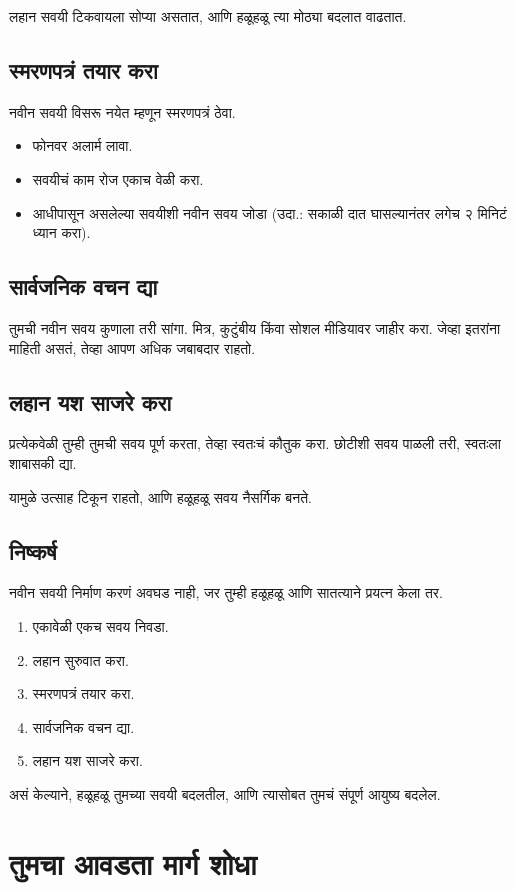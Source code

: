 लहान सवयी टिकवायला सोप्या असतात,  
आणि हळूहळू त्या मोठ्या बदलात वाढतात.  

\section*{स्मरणपत्रं तयार करा}
नवीन सवयी विसरू नयेत म्हणून स्मरणपत्रं ठेवा.  
\begin{itemize}
\item फोनवर अलार्म लावा.  
\item सवयीचं काम रोज एकाच वेळी करा.  
\item आधीपासून असलेल्या सवयीशी नवीन सवय जोडा  
(उदा.: सकाळी दात घासल्यानंतर लगेच २ मिनिटं ध्यान करा).  
\end{itemize}

\section*{सार्वजनिक वचन द्या}
तुमची नवीन सवय कुणाला तरी सांगा.  
मित्र, कुटुंबीय किंवा सोशल मीडियावर जाहीर करा.  
जेव्हा इतरांना माहिती असतं,  
तेव्हा आपण अधिक जबाबदार राहतो.  

\section*{लहान यश साजरे करा}
प्रत्येकवेळी तुम्ही तुमची सवय पूर्ण करता,  
तेव्हा स्वतःचं कौतुक करा.  
छोटीशी सवय पाळली तरी,  
स्वतःला शाबासकी द्या.  

यामुळे उत्साह टिकून राहतो,  
आणि हळूहळू सवय नैसर्गिक बनते.  

\section*{निष्कर्ष}
नवीन सवयी निर्माण करणं अवघड नाही,  
जर तुम्ही हळूहळू आणि सातत्याने प्रयत्न केला तर.  

\begin{enumerate}
\item एकावेळी एकच सवय निवडा.  
\item लहान सुरुवात करा.  
\item स्मरणपत्रं तयार करा.  
\item सार्वजनिक वचन द्या.  
\item लहान यश साजरे करा.  
\end{enumerate}

असं केल्याने,  
हळूहळू तुमच्या सवयी बदलतील,  
आणि त्यासोबत तुमचं संपूर्ण आयुष्य बदलेल.  



\chapter{तुमचा आवडता मार्ग शोधा}

